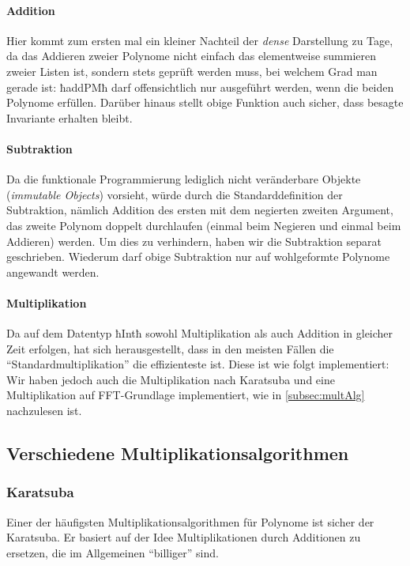 \paragraph{Addition} Hier kommt zum ersten mal ein kleiner Nachteil der
\emph{dense} Darstellung zu Tage, da das Addieren zweier Polynome nicht einfach
das elementweise summieren zweier Listen ist, sondern stets geprüft werden
muss, bei welchem Grad man gerade ist:
ħaddPMħ darf offensichtlich nur ausgeführt werden, wenn die beiden Polynome
 erfüllen. Darüber hinaus stellt obige Funktion auch sicher,
dass besagte Invariante erhalten bleibt.

\paragraph{Subtraktion} Da die funktionale Programmierung lediglich 
nicht veränderbare Objekte (\emph{immutable Objects}) vorsieht, würde durch die
Standarddefinition der Subtraktion, nämlich Addition des ersten mit dem
negierten zweiten Argument, das zweite Polynom doppelt durchlaufen (einmal beim
Negieren und einmal beim Addieren) werden. Um dies zu verhindern, haben wir die
Subtraktion separat geschrieben.
Wiederum darf obige Subtraktion nur auf wohlgeformte Polynome angewandt werden.

\paragraph{Multiplikation}
Da auf dem Datentyp ħIntħ sowohl Multiplikation als auch Addition in gleicher
Zeit erfolgen, hat sich herausgestellt, dass in den meisten Fällen die 
"`Standardmultiplikation"' die effizienteste ist. Diese ist wie folgt
implementiert:
Wir haben jedoch auch die Multiplikation nach Karatsuba und eine Multiplikation
auf FFT-Grundlage implementiert, wie in \autoref{subsec:multAlg} nachzulesen ist.

\subsection{Verschiedene Multiplikationsalgorithmen}
\label{subsec:multAlgs}

\subsubsection{Karatsuba}
Einer der häufigsten Multiplikationsalgorithmen für Polynome ist sicher der
Karatsuba. Er basiert auf der Idee Multiplikationen durch Additionen zu
ersetzen, die im Allgemeinen "`billiger"' sind. 

